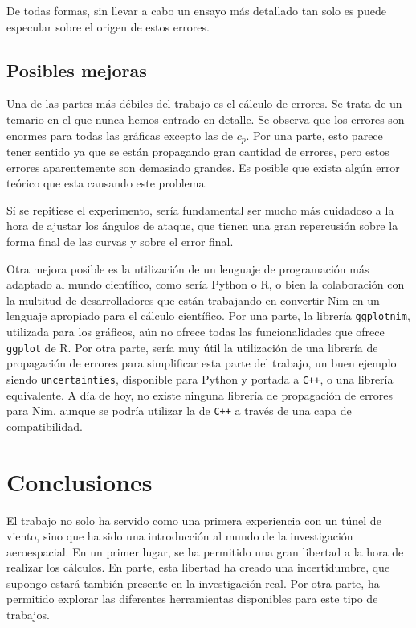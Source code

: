 \documentclass{article}
\begin{document}
De todas formas, sin llevar a cabo un ensayo más detallado tan solo es puede especular sobre el origen de estos errores.

\subsection{Posibles mejoras}

Una de las partes más débiles del trabajo es el cálculo de errores. Se trata de un temario en el que nunca hemos entrado 
en detalle. Se observa que los errores son enormes para todas 
las gráficas excepto las de $c_p$. Por una parte, esto parece tener sentido ya que se están propagando gran cantidad de errores,
pero estos errores aparentemente son demasiado grandes. Es posible que exista algún error teórico que esta causando este problema.

Sí se repitiese el experimento, sería fundamental ser mucho más cuidadoso a la hora de ajustar 
los ángulos de ataque, que tienen una gran repercusión sobre la forma final de las curvas y sobre el error final. 

Otra mejora posible es la utilización de un lenguaje de programación más adaptado al mundo científico, como sería Python o R, o bien 
la colaboración con la multitud de desarrolladores que están trabajando en convertir Nim en un lenguaje apropiado para 
el cálculo científico. Por una parte, la librería \verb+ggplotnim+, utilizada para los gráficos, aún no ofrece todas las funcionalidades
que ofrece \verb+ggplot+ de R. Por otra parte, sería muy útil la utilización de una librería de propagación de errores para 
simplificar esta parte del trabajo, un buen ejemplo siendo \verb+uncertainties+, disponible para Python y portada a \verb-C++-, o una
librería equivalente. A día de hoy, no existe ninguna librería de propagación de errores para Nim, aunque se podría utilizar 
la de \verb-C++- a través de una capa de compatibilidad.

\section{Conclusiones}

El trabajo no solo ha servido como una primera experiencia con un túnel de viento, sino que ha sido una introducción al mundo
de la investigación aeroespacial. En un primer lugar, se ha permitido una gran libertad a la hora de realizar los cálculos. 
En parte, esta libertad ha creado una incertidumbre, que supongo estará también presente en la investigación real. Por otra parte,
ha permitido explorar las diferentes herramientas disponibles para este tipo de trabajos. 
\end{document}
